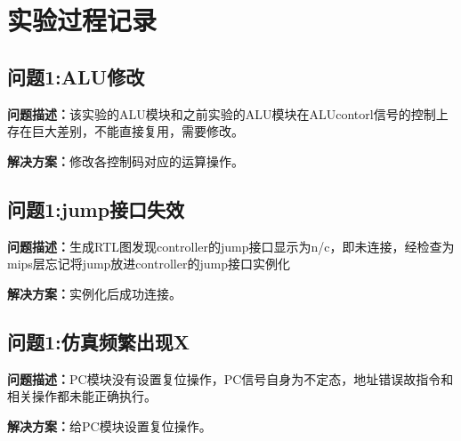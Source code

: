 \section{实验过程记录}
\subsection{问题1:ALU修改}
\textbf{问题描述：}该实验的ALU模块和之前实验的ALU模块在ALUcontorl信号的控制上存在巨大差别，不能直接复用，需要修改。

\textbf{解决方案：}修改各控制码对应的运算操作。
\subsection{问题1:jump接口失效}
\textbf{问题描述：}生成RTL图发现controller的jump接口显示为n/c，即未连接，经检查为mips层忘记将jump放进controller的jump接口实例化

\textbf{解决方案：}实例化后成功连接。
\subsection{问题1:仿真频繁出现X}
\textbf{问题描述：}PC模块没有设置复位操作，PC信号自身为不定态，地址错误故指令和相关操作都未能正确执行。

\textbf{解决方案：}给PC模块设置复位操作。